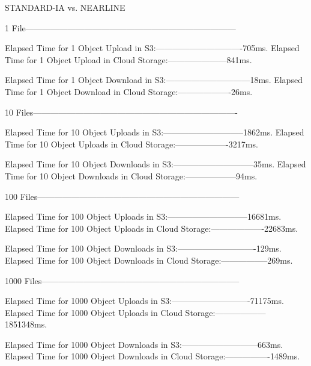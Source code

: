 \begin{code}
STANDARD-IA vs. NEARLINE

1 File---------------------------------------------------------------------------

Elapsed Time for 1  Object Upload in S3:-------------------------------705ms.
Elapsed Time for 1 Object Upload in Cloud Storage:---------------------841ms.

Elapsed Time for 1 Object Download in S3:------------------------------18ms.
Elapsed Time for 1 Object Download in Cloud Storage:-------------------26ms.

10 Files-------------------------------------------------------------------------

Elapsed Time for 10  Object Uploads in S3:-----------------------------1862ms.
Elapsed Time for 10 Object Uploads in Cloud Storage:-------------------3217ms.

Elapsed Time for 10 Object Downloads in S3:-----------------------------35ms.
Elapsed Time for 10 Object Downloads in Cloud Storage:------------------94ms.

100 Files------------------------------------------------------------------------

Elapsed Time for 100  Object Uploads in S3:-----------------------------16681ms.
Elapsed Time for 100 Object Uploads in Cloud Storage:-------------------22683ms.

Elapsed Time for 100 Object Downloads in S3:----------------------------129ms.
Elapsed Time for 100 Object Downloads in Cloud Storage:-----------------269ms.

1000 Files-----------------------------------------------------------------------

Elapsed Time for 1000  Object Uploads in S3:----------------------------71175ms.
Elapsed Time for 1000 Object Uploads in Cloud Storage:------------------1851348ms.

Elapsed Time for 1000 Object Downloads in S3:---------------------------663ms.
Elapsed Time for 1000 Object Downloads in Cloud Storage:----------------1489ms.
\end{code}

\newpage


